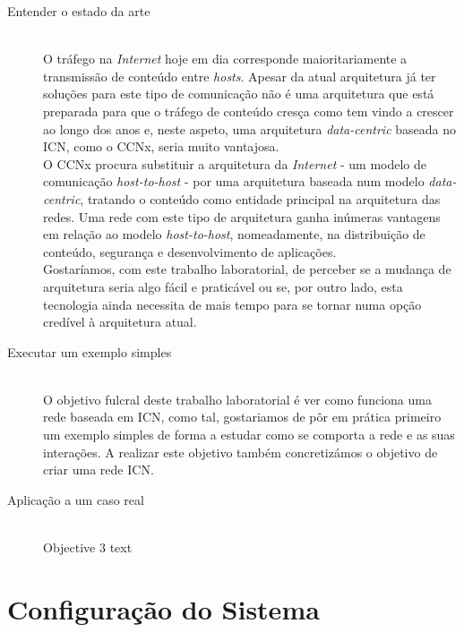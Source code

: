 \documentclass{report}
\begin{document}
\begin{description}
\item[Entender o estado da arte] \hfill \\

O tráfego na \textit{Internet} hoje em dia corresponde maioritariamente a transmissão de conteúdo entre \textit{hosts}. Apesar da atual arquitetura já ter soluções para este tipo de comunicação não é uma arquitetura que está preparada para que o tráfego de conteúdo cresça como tem vindo a crescer ao longo dos anos e, neste aspeto, uma arquitetura \textit{data-centric} baseada no ICN, como o CCNx, seria muito vantajosa\cite{icntar}.\\

O CCNx procura substituir a arquitetura da \textit{Internet} - um modelo de comunicação \textit{host-to-host} - por uma arquitetura baseada num modelo \textit{data-centric}, tratando o conteúdo como entidade principal na arquitetura das redes. Uma rede com este tipo de arquitetura ganha inúmeras vantagens em relação ao modelo \textit{host-to-host}, nomeadamente, na distribuição de conteúdo, segurança e desenvolvimento de aplicações\cite{icntar}.\\

Gostaríamos, com este trabalho laboratorial, de perceber se a mudança de arquitetura seria algo fácil e praticável ou se, por outro lado, esta tecnologia ainda necessita de mais tempo para se tornar numa opção credível à arquitetura atual.\\

\item[Executar um exemplo simples] \hfill \\

O objetivo fulcral deste trabalho laboratorial é ver como funciona uma rede baseada em ICN, como tal, gostariamos de pôr em prática primeiro um exemplo simples de forma a estudar como se comporta a rede e as suas interações. A realizar este objetivo também concretizámos o objetivo de criar uma rede ICN.\\


\item[Aplicação a um caso real] \hfill \\

Objective 3 text\\
\end{description}

\section{Configuração do Sistema}
\end{document}
